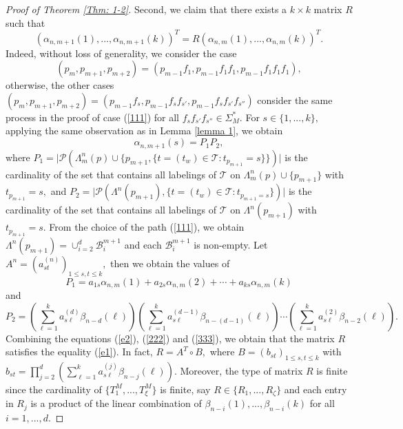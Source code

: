 \documentclass{amsart}
\theoremstyle{definition}
\begin{document}
\begin{proof}[Proof of Theorem \ref{Thm: 1-2}]
Second, we claim that there exists a $k\times k$ matrix $R$ such that 
\begin{equation}\label{e1}
(\alpha_{n,m+1}(1),...,\alpha_{n,m+1}(k))^T=R(\alpha_{n,m}(1),...,\alpha_{n,m}(k))^T.
\end{equation}
Indeed, without loss of generality, we consider the case 
\begin{equation}\label{111}
(p_m,p_{m+1},p_{m+2})=(p_{m-1}f_1,p_{m-1}f_1f_1,p_{m-1}f_1f_1f_1),
\end{equation}
otherwise, the other cases $(p_m,p_{m+1},p_{m+2})=(p_{m-1}f_s,p_{m-1}f_sf_{s'},p_{m-1}f_sf_{s'}f_{s''})$ consider the same process in the proof of case (\ref{111}) for all $f_sf_{s'}f_{s''}\in \Sigma_M^*.$
For $s\in \{1,...,k\},$ applying the same observation as in Lemma \ref{lemma 1}, we obtain
\begin{equation}\label{e2}
\alpha_{n,m+1}(s)=P_1P_2, 
\end{equation}
where $P_1=\lvert\mathcal{P}(\Lambda_m^n(p)\cup \{p_{m+1},\{t=(t_w)\in\mathcal{T}:t_{p_{m+1}}=s\}\})\rvert$ is the cardinality of the set that contains all labelings of $\mathcal{T}$ on $\Lambda_m^n (p)\cup \{p_{m+1}\}$ with $t_{p_{m+1}}=s,$ and $ P_2=\lvert\mathcal{P}(\Lambda^n(p_{m+1}),\{t=(t_w)\in \mathcal{T}:t_{p_{m+1}=s}\}) \rvert$ is the cardinality of the set that contains all labelings of $\mathcal{T}$ on $\Lambda^n(p_{m+1})$ with $t_{p_{m+1}}=s.$ From the choice of the path (\ref{111}), we obtain $\Lambda^n(p_{m+1})=\cup_{i=2}^{d}\mathcal{B}_i^{m+1}$ and each $\mathcal{B}_i^{m+1}$ is non-empty. Let $A^n=(a_{st}^{(n)})_{1\leq s,t\leq k},$ then we obtain the values of 
\begin{equation}\label{222}
P_1=a_{1s}\alpha_{n,m}(1)+a_{2s}\alpha_{n,m}(2)+\cdots +a_{ks}\alpha_{n,m}(k)
\end{equation}
and 
\begin{equation}\label{333}
P_2= \left(\sum_{\ell=1}^k a_{s\ell}^{(d)}\beta_{n-d}(\ell)\right)\left(\sum_{\ell=1}^k a_{s\ell}^{(d-1)}\beta_{n-(d-1)}(\ell)\right)\cdots \left(\sum_{\ell=1}^k a_{s\ell}^{(2)}\beta_{n-2}(\ell)\right).
\end{equation}
Combining the equations (\ref{e2}), (\ref{222}) and (\ref{333}), we obtain that the matrix $R$ satisfies the equality (\ref{e1}). In fact, $R=A^T\circ B,$ where $B=(b_{st})_{1\leq s,t\leq k}$ with $b_{st}=\prod_{j=2}^d\left(\sum_{\ell=1}^k a_{s\ell}^{(j)}\beta_{n-j}(\ell)\right).$ Moreover, the type of matrix $R$ is finite since the cardinality of $\{T_1^M,...,T_\xi^M\}$ is finite, say $R\in\{R_1,...,R_{\zeta}\}$ and each entry in $R_j$ is a product of the linear combination of $\beta_{n-i}(1),...,\beta_{n-i}(k)$ for all $i=1,...,d.$ 


\end{proof}
\end{document}

